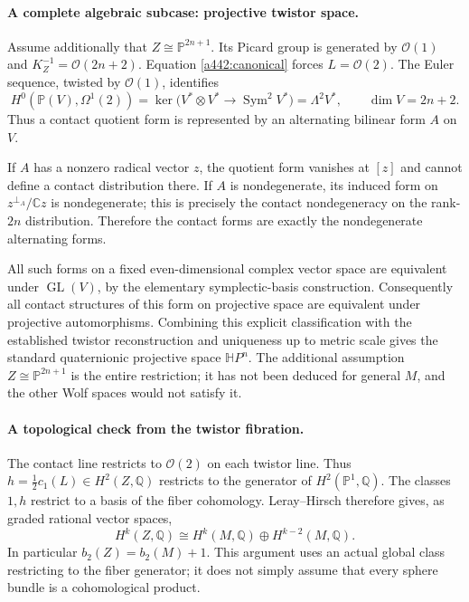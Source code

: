 \documentclass[11pt]{article}
\begin{document}
\paragraph{A complete algebraic subcase: projective twistor space.}
Assume additionally that $Z\cong\mathbb P^{2n+1}$.
Its Picard group is generated by $\mathcal O(1)$ and
$K_Z^{-1}=\mathcal O(2n+2)$. Equation
\eqref{a442:canonical} forces $L=\mathcal O(2)$.
The Euler sequence, twisted by $\mathcal O(1)$,
identifies
\[
 H^0(\mathbb P(V),\Omega^1(2))
 =\ker\bigl(V^*\otimes V^*\longrightarrow
                                  \operatorname{Sym}^2V^*\bigr)
 =\Lambda^2V^*,
 \qquad\dim V=2n+2.
\]
Thus a contact quotient form is represented by an
alternating bilinear form $A$ on $V$.

If $A$ has a nonzero radical vector $z$, the quotient
form vanishes at $[z]$ and cannot define a contact
distribution there. If $A$ is nondegenerate, its
induced form on $z^{\perp_A}/\mathbb Cz$ is
nondegenerate; this is precisely the contact
nondegeneracy on the rank-$2n$ distribution.
Therefore the contact forms are exactly the
nondegenerate alternating forms.

All such forms on a fixed even-dimensional complex
vector space are equivalent under $\operatorname{GL}(V)$,
by the elementary symplectic-basis construction.
Consequently all contact structures of this form
on projective space are equivalent under projective
automorphisms. Combining this explicit classification
with the established twistor reconstruction and
uniqueness up to metric scale gives the standard
quaternionic projective space $\mathbb H P^n$.
The additional assumption $Z\cong\mathbb P^{2n+1}$
is the entire restriction; it has not been deduced
for general $M$, and the other Wolf spaces would
not satisfy it.

\paragraph{A topological check from the twistor fibration.}
The contact line restricts to $\mathcal O(2)$ on
each twistor line. Thus
$h=\tfrac12c_1(L)\in H^2(Z,\mathbb Q)$ restricts
to the generator of $H^2(\mathbb P^1,\mathbb Q)$.
The classes $1,h$ restrict to a basis of the
fiber cohomology. Leray--Hirsch therefore gives,
as graded rational vector spaces,
\[
 H^k(Z,\mathbb Q)\cong
 H^k(M,\mathbb Q)\oplus H^{k-2}(M,\mathbb Q).
\]
In particular $b_2(Z)=b_2(M)+1$. This argument
uses an actual global class restricting to the
fiber generator; it does not simply assume that
every sphere bundle is a cohomological product.
\end{document}
